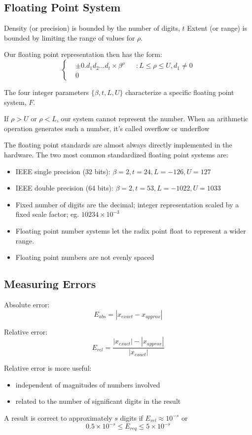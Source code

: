 \documentclass[12pt]{article}
\begin{document}
\subsection{Floating Point System}

Density (or precision) is bounded by the number of digits, $t$  
Extent (or range) is bounded by limiting the range of values for $\rho$. 

Our floating point representation then has the form: 
$$  
\left\{\begin{aligned}  
&\pm 0.d_1 d_2 \dots d_t \times \beta^\rho &&: L \leq \rho \leq U, d_1 \neq 0\\  
&0 
\end{aligned}  
\right.$$

The four integer parameters $\{\beta, t, L, U\}$ characterize a specific floating point system, $F$. 


If $\rho > U$ or $\rho < L$, our system cannot represent the number. When an arithmetic operation generates such a number, it's called overflow or underflow

The floating point standards are almost always directly implemented in the hardware. The two most common standardized floating point systems are: 
\begin{itemize}
    \item IEEE single precision (32 bits): $\beta = 2, t=24, L=-126, U=127$
    \item IEEE double precision (64 bits): $\beta = 2, t=53, L=-1022, U=1033$
\end{itemize}

\begin{itemize}
    \item Fixed number of digits are the decimal; integer representation scaled by a fixed scale factor; eg. $10234 \times 10^{-3}$
    \item Floating point number systems let the radix point float to represent a wider range.  
    \item Floating point numbers are not evenly spaced
\end{itemize}


\subsection{Measuring Errors}

Absolute error: 
$$E_{abs} = | x_{exact} - x_{approx} |$$

Relative error: 
$$E_{rel} = \frac{|x_{exact}| - |x_{approx}|} {|x_{exact}|}$$


Relative error is more useful: 
\begin{itemize}
\item independent of magnitudes of numbers involved
\item related to the number of significant digits in the result
\end{itemize}

A result is correct to approximately $s$ digits if $E_{rel} \approx 10^{-s}$ or $$0.5 \times 10^{-s} \leq E_{req} \le 5 \times 10^{-s}$$
\end{document}
